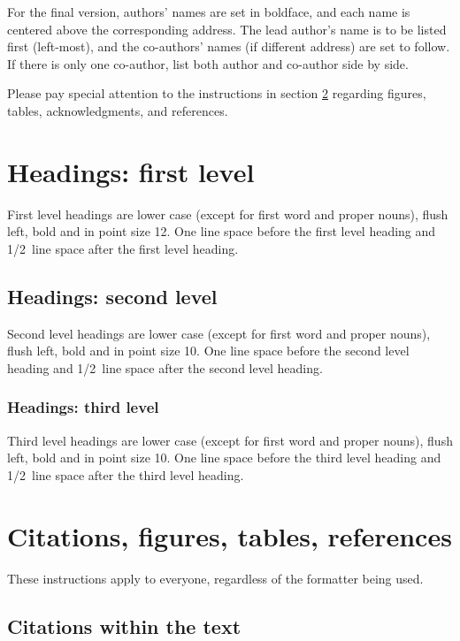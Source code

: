\documentclass{article} %
\begin{document}

For the final version, authors' names are
set in boldface, and each name is centered above the corresponding
address. The lead author's name is to be listed first (left-most), and
the co-authors' names (if different address) are set to follow. If
there is only one co-author, list both author and co-author side by side.

Please pay special attention to the instructions in section \ref{others}
regarding figures, tables, acknowledgments, and references.

\section{Headings: first level}
\label{headings}

First level headings are lower case (except for first word and proper nouns),
flush left, bold and in point size 12. One line space before the first level
heading and 1/2~line space after the first level heading.

\subsection{Headings: second level}

Second level headings are lower case (except for first word and proper nouns),
flush left, bold and in point size 10. One line space before the second level
heading and 1/2~line space after the second level heading.

\subsubsection{Headings: third level}

Third level headings are lower case (except for first word and proper nouns),
flush left, bold and in point size 10. One line space before the third level
heading and 1/2~line space after the third level heading.

\section{Citations, figures, tables, references}
\label{others}

These instructions apply to everyone, regardless of the formatter being used.

\subsection{Citations within the text}
\end{document}

